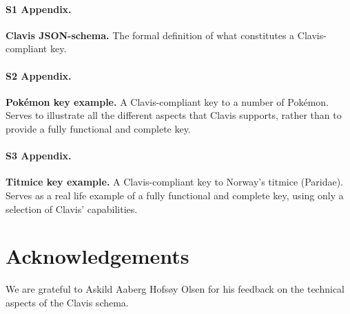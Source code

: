 \documentclass[10pt,letterpaper]{article}
\begin{document}
\paragraph*{S1 Appendix.}
\label{S1_Appendix}
{\bf Clavis JSON-schema.} The formal definition of what constitutes a Clavis-compliant key.

\paragraph*{S2 Appendix.}
\label{S2_Appendix}
{\bf Pokémon key example.} A Clavis-compliant key to a number of Pokémon. Serves to illustrate all the different aspects that Clavis supports, rather than to provide a fully functional and complete key.

\paragraph*{S3 Appendix.}
\label{S3_Appendix}
{\bf Titmice key example.} A Clavis-compliant key to Norway's titmice (Paridae). Serves as a real life example of a fully functional and complete key, using only a selection of Clavis' capabilities.

\section*{
Acknowledgements
}
We are grateful to Askild Aaberg Hofsøy Olsen for his feedback on the technical aspects of the Clavis schema. 
\nolinenumbers

\end{document}
